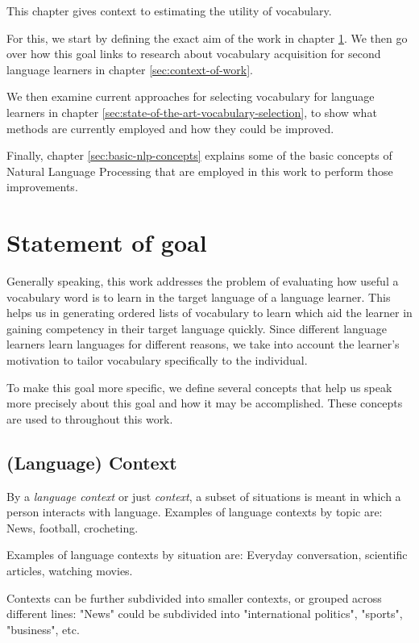 This chapter gives context to estimating the utility of vocabulary.

For this, we start by defining the exact aim of the work  in chapter \ref{sec:statement-of-goal}.
We then go over how this goal links to research about vocabulary acquisition for second language learners in chapter \ref{sec:context-of-work}.

We then examine current approaches for selecting vocabulary for language learners in chapter \ref{sec:state-of-the-art-vocabulary-selection}, to show what methods are currently employed and how they could be improved.

Finally, chapter \ref{sec:basic-nlp-concepts} explains some of the basic concepts of Natural Language Processing that are employed in this work to perform those improvements.



\section{Statement of goal} \label{sec:statement-of-goal}

Generally speaking, this work addresses the problem of evaluating how useful a vocabulary word is to learn in the target language of a language learner.
This helps us in generating ordered lists of vocabulary to learn which aid the learner in gaining competency in their target language quickly.
Since different language learners learn languages for different reasons, we take into account the learner's motivation to tailor vocabulary specifically to the individual.

To make this goal more specific, we define several concepts that help us speak more precisely about this goal and how it may be accomplished.
These concepts are used to throughout this work.
\subsection{(Language) Context}
By a \textit{language context} or just \textit{context}, a subset of situations is meant in which a person interacts with language.
Examples of language contexts by topic are:
News, football, crocheting.

Examples of language contexts by situation are:
Everyday conversation, scientific articles, watching movies.

Contexts can be further subdivided into smaller contexts, or grouped across different lines:
"News" could be subdivided into "international politics", "sports", "business", etc.

